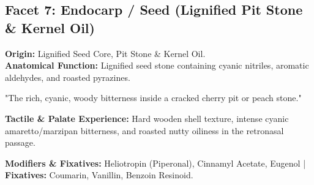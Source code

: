 \documentclass[11pt,a4paper]{article}
\begin{document}
\newpage

\subsection{Facet 7: Endocarp / Seed (Lignified Pit Stone \& Kernel Oil)}

\begin{botanicalbox}
\textbf{Origin:} Lignified Seed Core, Pit Stone \& Kernel Oil.\\
\textbf{Anatomical Function:} Lignified seed stone containing cyanic nitriles, aromatic aldehydes, and roasted pyrazines.
\end{botanicalbox}

\begin{sensoryquote}
"The rich, cyanic, woody bitterness inside a cracked cherry pit or peach stone."
\end{sensoryquote}

\begin{flavourbox}
\textbf{Tactile \& Palate Experience:} Hard wooden shell texture, intense cyanic amaretto/marzipan bitterness, and roasted nutty oiliness in the retronasal passage.
\end{flavourbox}

\begin{table}[htbp]
\centering
\caption{Primary Impact Actors for Facet 7 (Endocarp / Seed)}
\vspace{0.3em}
\end{table}

\textbf{Modifiers \& Fixatives:} Heliotropin (Piperonal), Cinnamyl Acetate, Eugenol | \textbf{Fixatives:} Coumarin, Vanillin, Benzoin Resinoid.

\vspace{1.5em}
\end{document}

